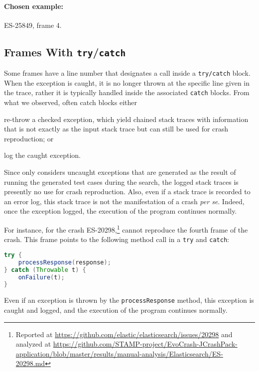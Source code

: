 \paragraph{Chosen example:} 
ES-25849, frame 4.

\subsection{Frames With \texttt{try}/\texttt{catch}}

Some frames have a line number that designates a call inside a \texttt{try/catch} block.
When the exception is caught, it is no longer thrown at the specific line given in the trace, rather it is typically handled inside the associated \texttt{catch} blocks.
From what we observed, often catch blocks either
\begin{inparaenum}[(i)]
\item re-throw a checked exception, which yield chained stack traces with information that is not exactly as the input stack trace but can still be used for crash reproduction;
 or \item log the caught exception.
\end{inparaenum}
%
Since \evocrash only considers uncaught exceptions that are generated as the result of running the generated test cases during the search, the logged stack traces is presently no use for crash reproduction. Also, even if a stack trace is recorded to an error log, this stack trace is not the manifestation of a crash \textit{per se}. Indeed, once the exception logged, the execution of the program continues normally. 

For instance, for the crash ES-20298,\footnote{Reported at \url{https://github.com/elastic/elasticsearch/issues/20298} and analyzed at \url{https://github.com/STAMP-project/EvoCrash-JCrashPack-application/blob/master/results/manual-analysis/Elasticsearch/ES-20298.md}} \evocrash cannot reproduce the fourth frame of the crash. This frame points to the following method call in a \texttt{try} and \texttt{catch}:
%
\begin{lstlisting}[language=Java]
try {
    processResponse(response);
} catch (Throwable t) {
    onFailure(t);
}
\end{lstlisting}
%
Even if an exception is thrown by the \texttt{processResponse} method, this exception is caught and logged, and the execution of the program continues normally. 

